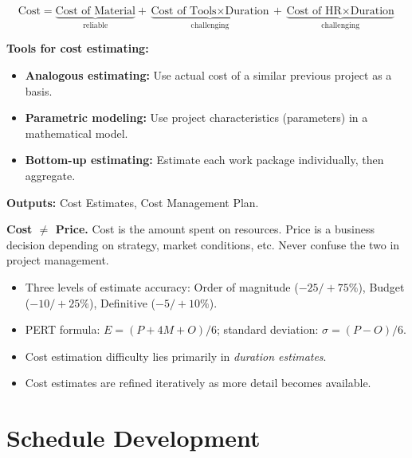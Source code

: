 \documentclass[11pt,a4paper]{article}
\theoremstyle{definition}
\theoremstyle{plain}
\begin{document}
\begin{formulabox}
\[
  \text{Cost} = \underbrace{\text{Cost of Material}}_{\text{reliable}} + \underbrace{\text{Cost of Tools} \times \text{Duration}}_{\text{challenging}} + \underbrace{\text{Cost of HR} \times \text{Duration}}_{\text{challenging}}
\]
\end{formulabox}

\textbf{Tools for cost estimating:}
\begin{itemize}[nosep]
  \item \textbf{Analogous estimating:} Use actual cost of a similar previous project as a basis.
  \item \textbf{Parametric modeling:} Use project characteristics (parameters) in a mathematical model.
  \item \textbf{Bottom-up estimating:} Estimate each work package individually, then aggregate.
\end{itemize}

\textbf{Outputs:} Cost Estimates, Cost Management Plan.

\begin{warning}
\textbf{Cost $\neq$ Price.} Cost is the amount spent on resources. Price is a business decision depending on strategy, market conditions, etc. Never confuse the two in project management.
\end{warning}

\begin{keytakeaways}
\begin{itemize}[nosep]
  \item Three levels of estimate accuracy: Order of magnitude ($-25/+75\%$), Budget ($-10/+25\%$), Definitive ($-5/+10\%$).
  \item PERT formula: $E = (P + 4M + O)/6$; standard deviation: $\sigma = (P - O)/6$.
  \item Cost estimation difficulty lies primarily in \emph{duration estimates}.
  \item Cost estimates are refined iteratively as more detail becomes available.
\end{itemize}
\end{keytakeaways}


\section{Schedule Development}
\end{document}
